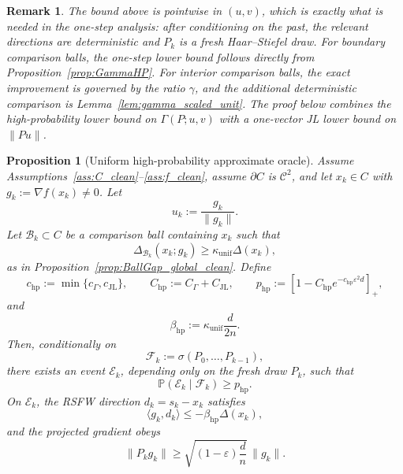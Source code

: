 \documentclass{article}
\newtheorem{proposition}{Proposition}
\newtheorem{remark}{Remark}
\begin{document}
\begin{remark}
\label{rem:hp_oracle_global}
The bound above is pointwise in \((u,v)\), which is exactly what is needed in
the one-step analysis: after conditioning on the past, the relevant directions
are deterministic and \(P_k\) is a fresh Haar--Stiefel draw. For boundary
comparison balls, the one-step lower bound follows directly from
Proposition~\ref{prop:GammaHP}. For interior comparison balls, the exact
improvement is governed by the ratio \(\gamma\), and the additional deterministic
comparison is Lemma~\ref{lem:gamma_scaled_unit}. The proof below combines the
high-probability lower bound on \(\Gamma(P;u,v)\) with a one-vector JL lower
bound on \(\|Pu\|\).
\end{remark}

\begin{proposition}[Uniform high-probability approximate oracle]
\label{prop:hp_oracle_uniform}
Assume Assumptions~\ref{ass:C_clean}--\ref{ass:f_clean}, assume
\(\partial C\) is \(\mathcal C^2\), and let \(x_k\in C\) with
\(g_k:=\nabla f(x_k)\neq0\). Let
\[
u_k:=\frac{g_k}{\|g_k\|}.
\]
Let \(\mathcal B_k\subset C\) be a comparison ball containing \(x_k\) such that
\[
\Delta_{\mathcal B_k}(x_k;g_k)
\ge
\kappa_{\mathrm{unif}}\Delta(x_k),
\]
as in Proposition~\ref{prop:BallGap_global_clean}. Define
\[
c_{\mathrm{hp}}:=\min\{c_{\Gamma},c_{\mathrm{JL}}\},
\qquad
C_{\mathrm{hp}}:=C_{\Gamma}+C_{\mathrm{JL}},
\qquad
p_{\mathrm{hp}}
:=
\left[
1-C_{\mathrm{hp}}e^{-c_{\mathrm{hp}}\varepsilon^2d}
\right]_+,
\]
and
\[
\beta_{\mathrm{hp}}
:=
\kappa_{\mathrm{unif}}\frac{d}{2n}.
\]
Then, conditionally on
\[
\mathcal F_k:=\sigma(P_0,\ldots,P_{k-1}),
\]
there exists an event \(\mathcal E_k\), depending only on the fresh draw
\(P_k\), such that
\begin{equation}
\mathbb P(\mathcal E_k\mid\mathcal F_k)
\ge
p_{\mathrm{hp}}.
\label{eq:hp_oracle_prob_uniform}
\end{equation}
On \(\mathcal E_k\), the RSFW direction \(d_k=s_k-x_k\) satisfies
\begin{equation}
\langle g_k,d_k\rangle
\le
-\beta_{\mathrm{hp}}\Delta(x_k),
\label{eq:hp_oracle_uniform}
\end{equation}
and the projected gradient obeys
\begin{equation}
\|P_k g_k\|
\ge
\sqrt{(1-\varepsilon)\frac dn}\,\|g_k\|.
\label{eq:hp_projected_gradient}
\end{equation}
\end{proposition}
\end{document}
